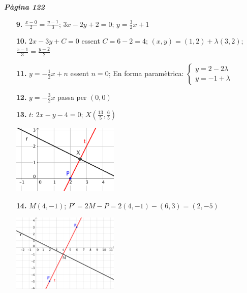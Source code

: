 \documentclass[a4paper, pdf, twoside]{book}
\begin{document}
\begin{multicols}{2}
{\textbf{\em Pàgina 122}} \hrulefill
\begin{enumerate}
\vspace{0.25cm}
\item[\fontfamily{phv}\selectfont\color{blue}\textbf{9. }] 
$\frac {x-0}{2} =\frac {y-1}{3}$; $3x-2y+2=0$; $y=\frac {3}{2}x+1$
 \end{enumerate}
\begin{enumerate}
\vspace{0.25cm}
\item[\fontfamily{phv}\selectfont\color{blue}\textbf{10. }] 
$2x-3y+C=0$ essent $C=6-2=4$; $(x,y)=(1,2)+\lambda (3,2)$; $\frac {x-1}{3}=\frac {y-2}{2}$
\vspace{0.25cm}
\item[\fontfamily{phv}\selectfont\color{blue}\textbf{11. }] 
$y=-\frac {1}{2}x+n$ essent $n=0$; En forma paramètrica: $\left \{ \begin {array}{l} y=2-2\lambda \\ y=-1+\lambda \end {array} \right .$
\vspace{0.25cm}
\item[\fontfamily{phv}\selectfont\color{blue}\textbf{12. }] 
$y=-\frac {3}{2}x$ passa per $(0,0)$
\vspace{0.25cm}
\item[\fontfamily{phv}\selectfont\color{blue}\textbf{13. }] 
$t:\, 2x-y-4=0$; $X(\frac {13}{5}, \frac {6}{5})$\par \includegraphics [width=0.4\textwidth ]{img-sol/t9-12}
\vspace{0.25cm}
\item[\fontfamily{phv}\selectfont\color{blue}\textbf{14. }] 
$M(4,-1)$; $P'=2M-P=2(4,-1)-(6,3)=(2,-5)$\par \includegraphics [width=0.4\textwidth ]{img-sol/t9-13}
 \end{enumerate}
\vspace{0.3cm}


\end{multicols}
\end{document}
